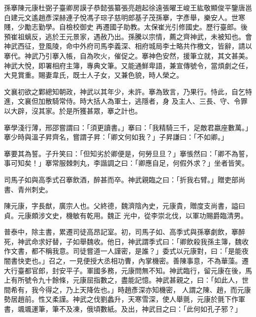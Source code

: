 
\begin{pinyinscope}

 孫搴陳元康杜弼子臺卿房謨子恭懿張纂張亮趙起徐遠張曜王峻王紘敬顯俊平鑒唐邕白建元文遙趙彥深赫連子悅馮子琮子慈明郎基子茂孫搴，字彥舉，樂安人。世寒賤，少勵志勤學。自檢校御史
 再遷國子助教。太保崔光引修國史。歷行臺郎。後預崔祖螭反，逃於王元景家，遇赦乃出。孫騰以宗情，薦之齊神武，未被知也。會神武西征，登風陵，命中外府司馬李義深、相府城局李士略共作檄文，皆辭，請以搴代。神武乃引搴入帳，自為吹火，催促之。搴神色安然，援筆立就，其文甚美。神武大悅，即署相府主簿，專典文筆。又能通鮮卑語，兼宣傳號令，當煩劇之任，大見賞重。賜妻韋氏，既士人子女，又兼色貌，時人榮之。



 文襄初欲之鄴總知朝政，神武以其年少，未許。搴為致言，乃果行。恃此，自乞特進，文襄但加散騎常侍。時大括人為軍士，逃隱者，身
 及主人、三長、守、令罪以大辟，沒其家。於是所獲甚眾，搴之計也。



 搴學淺行薄，邢邵嘗謂曰：「須更讀書。」搴曰：「我精騎三千，足敵君嬴座數萬。」搴少時與溫子昇齊名，嘗謂子昇：「卿文何如我？」子昇謙曰：「不如卿。」



 搴要其為誓。子升笑曰：「但知劣於卿便是，何勞旦旦？」搴悵然曰：「卿不為誓，事可知矣！」搴常服棘刺丸，李諧調之曰：「卿應自足，何假外求？」坐者皆笑。



 司馬子如與高季式召搴飲酒，醉甚而卒。神武親臨之曰：「折我右臂。」贈吏部尚書、青州刺史。



 陳元康，字長猷，廣宗人也。父終德，魏濟陰內史，元康貴，贈度支尚書，謚曰貞。元康頗涉文史，機敏有乾用。魏正
 光中，從李崇北伐，以軍功賜爵臨清男。



 普泰中，除主書，累遷司徒高昂記室。初，司馬子如、高季式與孫搴劇飲，搴醉死，神武命求好替，子如舉魏收。他日，神武謂季式曰：「卿飲殺我孫主簿，魏收作文書，都不稱我意。司徒嘗道一人謹密，是誰？」委式以元康對，曰：「是能夜闇書快吏也。」召之，一見便授大丞相功曹，內掌機密。善陳事意，不為華藻。遷大行臺都官郎，封安平子。軍國多務，元康問無不知。神武臨行，留元康在後，馬上有所號令九十餘條，元康屈指數之，盡能記憶。神武甚親之，曰：「如此人，世間希有，我今得之，乃上天降佐也。」時趙彥深亦知機密，
 人謂之陳、趙，而元康勢居趙前。性又柔謹。神武之伐劉蠡升，天寒雪深，使人舉氈，元康於氈下作軍書，颯颯運筆，筆不及凍，俄頃數紙。及出，神武目之曰：「此何如孔子邪？」




\end{pinyinscope}
